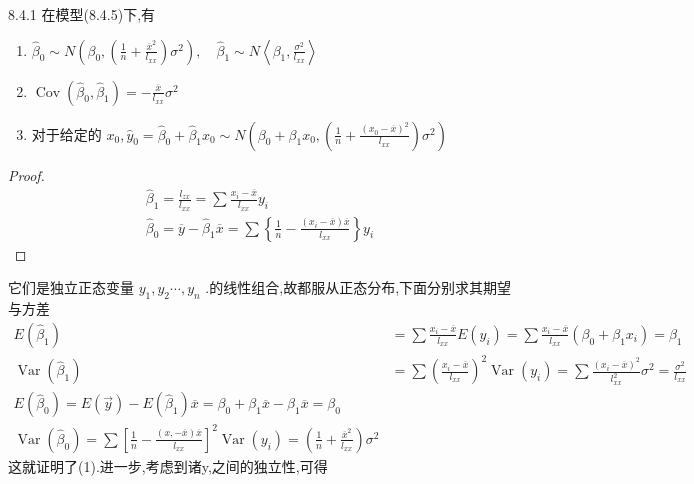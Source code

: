 \begin{theorem}{}{8.4.1}
	在模型(8.4.5)下,有
	\begin{enumerate}
		\item  $ {\hat{\beta}_{0} \sim N\left(\beta_{0},\left(\frac{1}{n}+\frac{\overline{x}^{2}}{l_{x x}}\right) \sigma^{2}\right), \quad \hat{\beta}_{1} \sim N\left\langle\beta_{1}, \frac{\sigma^{2}}{l_{x x}}\right\rangle}   $ 
		\item ${\operatorname{Cov}\left(\hat{\beta}_{0}, \hat{\beta}_{1}\right)=-\frac{\overline{x}}{l_{x x}} \sigma^{2}}$
		\item 对于给定的  $ x_{0}, \hat{y}_{0}=\hat{\beta}_{0}+\hat{\beta}_{1} x_{0} \sim N\left(\beta_{0}+\beta_{1} x_{0},\left(\frac{1}{n}+\frac{\left(x_{0}-\overline{x}\right)^{2}}{l_{x x}}\right) \sigma^{2}\right)  $ 
	\end{enumerate}
	\begin{proof}{}{}	
		\[
		\begin{array}{l}{\hat{\beta}_{1}=\frac{l_{z x}}{l_{x x}}=\sum \frac{x_{i}-\overline{x}}{l_{x x}} y_{i}} \\ {\hat{\beta}_{0}=\overline{y}-\hat{\beta}_{1} \overline{x}=\sum\left\{\frac{1}{n}-\frac{\left(x_{i}-\overline{x}\right) \overline{x}}{l_{x x}}\right\} y_{i}}\end{array}
		\]
	\end{proof}	
	它们是独立正态变量 $ y_1,y_2\cdots,y_n  $ .的线性组合,故都服从正态分布,下面分别求其期望与方差
	\[
	\begin{aligned} 
	E\left(\hat{\beta}_{1}\right) &=\sum \frac{x_{i}-\overline{x}}{l_{x x}} E\left(y_{i}\right)=\sum \frac{x_{i}-\overline{x}}{l_{x x}}\left(\beta_{0}+\beta_{1} x_{i}\right)=\beta_{1} \\ 
	\operatorname{Var}\left(\hat{\beta}_{1}\right) &=\sum\left(\frac{x_{i}-\overline{x}}{l_{x x}}\right)^{2} \operatorname{Var}\left(y_{i}\right)=\sum \frac{\left(x_{i}-\overline{x}\right)^{2}}{l_{x x}^{2}} \sigma^{2}=\frac{\sigma^{2}}{l_{x x}} \\ 
	{E\left(\hat{\beta}_{0}\right)=E(\vec{y})-E\left(\hat{\beta}_{1}\right) \overline{x}=\beta_{0}+\beta_{1} \overline{x}-\beta_{1} \overline{x}=\beta_{0}} \\ {\operatorname{Var}\left(\hat{\beta}_{0}\right)=\sum\left[\frac{1}{n}-\frac{(x,-\overline{x}) \overline{x}}{l_{x x}}\right]^{2} \operatorname{Var}\left(y_{i}\right)=\left(\frac{1}{n}+\frac{\overline{x}^{2}}{l_{x x}}\right) \sigma^{2}}
	\end{aligned}
	\]
	这就证明了(1).进一步,考虑到诸y,之间的独立性,可得

\end{theorem}
